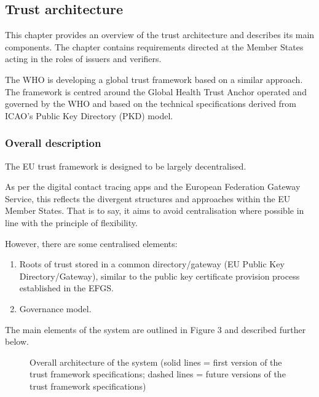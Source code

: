\documentclass[a4paper,12pt,english]{sphinxhowto}
\begin{document}
\subsection{Trust architecture}
\label{\detokenize{ssi/annotehealth:trust-architecture}}
\sphinxAtStartPar
This chapter provides an overview of the trust architecture and describes its main components. The chapter contains requirements directed at the Member States acting in the roles of issuers and verifiers.

\sphinxAtStartPar
The WHO is developing a global trust framework based on a similar approach. The framework is centred around the Global Health Trust Anchor operated and governed by the WHO and based on the technical specifications derived from ICAO’s Public Key Directory (PKD) model.


\subsubsection{Overall description}
\label{\detokenize{ssi/annotehealth:overall-description}}
\sphinxAtStartPar
The EU trust framework is designed to be largely decentralised.

\sphinxAtStartPar
As per the digital contact tracing apps and the European Federation Gateway Service, this reflects the divergent structures and approaches within the EU Member States. That is to say, it aims to avoid centralisation where possible in line with the principle of flexibility.

\sphinxAtStartPar
However, there are some centralised elements:
\begin{enumerate}
%
\item {} 
\sphinxAtStartPar
Roots of trust stored in a common directory/gateway (EU Public Key Directory/Gateway), similar to the public key certificate provision process established in the EFGS.

\item {} 
\sphinxAtStartPar
Governance model.

\end{enumerate}

\sphinxAtStartPar
The main elements of the system are outlined in Figure 3 and described further below.

\begin{figure}[htbp]
\centering
\capstart

\noindent{}
\caption{Overall architecture of the system (solid lines = first version of the trust framework specifications; dashed lines = future versions of the trust framework specifications)}\label{\detokenize{ssi/annotehealth:id10}}\end{figure}
\end{document}
